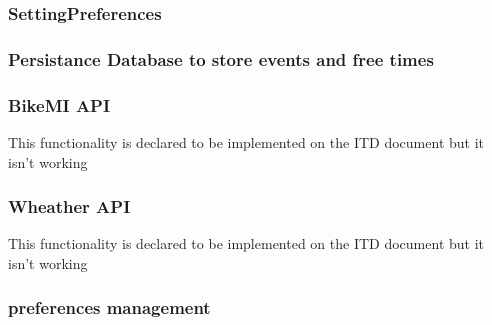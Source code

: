 \subsubsection{SettingPreferences}

\subsubsection{Persistance Database to store events and free times}

\subsubsection{BikeMI API}
This functionality is declared to be implemented on the ITD document but it isn't working

\subsubsection{Wheather API}
This functionality is declared to be implemented on the ITD document but it isn't working

\subsubsection{preferences management}




